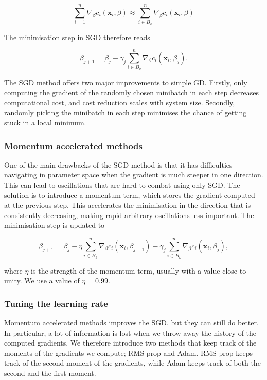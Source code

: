 \documentclass[a4paper,
amsfonts,
amssymb,
amsmath,
reprint,
showkeys,
nofootinbib,
twoside]{revtex4-2}
\begin{document}
\begin{equation}
    \sum_{i = 1}^n \nabla_{\beta}c_i(\bm{x}_i, \beta) \approx \sum_{i \in B_k}^n \nabla_{\beta}c_i(\bm{x}_i, \beta)
\end{equation}

The minimisation step in SGD therefore reads

\begin{equation}
    \beta_{j+1} = \beta_j - \gamma_j  \sum_{i \in B_k}^n \nabla_{\beta}c_i(\bm{x}_i, \beta_j).
\end{equation}

The SGD method offers two major improvements to simple GD. Firstly, only computing the gradient of the randomly chosen minibatch in each step decreases computational cost, and cost reduction scales with system size. Secondly, randomly picking the minibatch in each step minimises the chance of getting stuck in a local minimum.

\subsubsection{Momentum accelerated methods}

One of the main drawbacks of the SGD method is that it has difficulties navigating in parameter space when the gradient is much steeper in one direction. This can lead to oscillations that are hard to combat using only SGD. The solution is to introduce a momentum term, which stores the gradient computed at the previous step. This accelerates the minimisation in the direction that is consistently decreasing, making rapid arbitrary oscillations less important. The minimisation step is updated to

\begin{equation}
    \beta_{j+1} = \beta_j - \eta \sum_{i \in B_k}^n \nabla_{\beta}c_i(\bm{x}_i, \beta_{j-1})  - \gamma_j  \sum_{i \in B_k}^n \nabla_{\beta}c_i(\bm{x}_i, \beta_j),
\end{equation}

where $\eta$ is the strength of the momentum term, usually with a value close to unity. We use a value of $\eta = 0.99$.

\subsubsection{Tuning the learning rate}

Momentum accelerated methods improves the SGD, but they can still do better. In particular, a lot of information is lost when we throw away the history of the computed gradients. We therefore introduce two methods that keep track of the moments of the gradients we compute; RMS prop and Adam. RMS prop keeps track of the second moment of the gradients, while Adam keeps track of both the second and the first moment.
\end{document}
